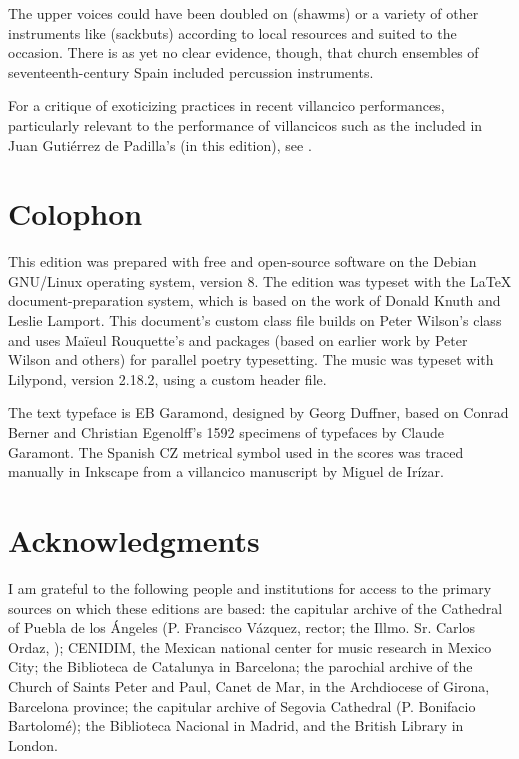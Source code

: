 The upper voices could have been doubled on  (shawms) or a variety of other instruments like  (sackbuts) according to local resources and suited to the occasion.
There is as yet no clear evidence, though, that church ensembles of seventeenth-century Spain included percussion instruments.%
  \begin{Footnote}
  For a critique of exoticizing practices in recent villancico performances, particularly relevant to the performance of  villancicos such as the  included in Juan Gutiérrez de Padilla's  (in this edition), see \autocite{Baker:PerformancePostColonial}.
  \end{Footnote}

\section{Colophon}

This edition was prepared with free and open-source software on the Debian GNU/Linux operating system, version 8.
The edition was typeset with the \LaTeX{} document-preparation system, which is based on the work of Donald Knuth and Leslie Lamport.
This document's custom class file builds on Peter Wilson's  class and uses Maïeul Rouquette's  and  packages (based on earlier work by Peter Wilson and others) for parallel poetry typesetting.
The music was typeset with Lilypond, version 2.18.2, using a custom header file.

The text typeface is EB Garamond, designed by Georg Duffner, based on Conrad Berner and Christian Egenolff's 1592 specimens of typefaces by Claude Garamont.
The Spanish CZ metrical symbol used in the scores was traced manually in Inkscape from a villancico manuscript by Miguel de Irízar.

\section{Acknowledgments}

I am grateful to the following people and institutions for access to the primary sources on which these editions are based: 
the capitular archive of the Cathedral of Puebla de los Ángeles (P. Francisco Vázquez, rector; the Illmo. Sr. Carlos Ordaz, );
CENIDIM, the Mexican national center for music research in Mexico City;
the Biblioteca de Catalunya in Barcelona;
the parochial archive of the Church of Saints Peter and Paul, Canet de Mar, in the Archdiocese of Girona, Barcelona province;
the capitular archive of Segovia Cathedral (P. Bonifacio Bartolomé);
the Biblioteca Nacional in Madrid, and
the British Library in London.

